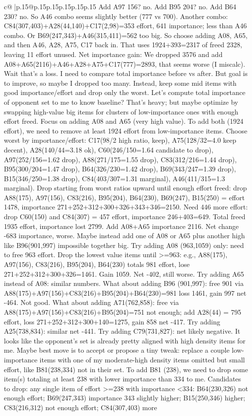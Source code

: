 \documentclass{article}
\begin{document}
{\begin{supertabular}{c@{$\;$}|p{.15\linewidth}@{}p{.15\linewidth}p{.15\linewidth}p{.15\linewidth}p{.15\linewidth}p{.15\linewidth}}
{{{Add A97 156? no. Add B95 204? no. Add B64 230? no. So A46 combo seems slightly better (777 vs 700). Another combo: C84(307,403)+A28(44,140)+C17(2,98)=353 effort, 641 importance; less than A46 combo. Or B69(247,343)+A46(315,411)=562 too big. So choose adding A08, A65, and then A46, A28, A75, C17 back in. That uses 1924+393=2317 of freed 2328, leaving 11 effort unused. Net importance gain: We dropped 3576 and add A08+A65(2116)+A46+A28+A75+C17(777)=2893, that seems worse (I miscalc). Wait that's a loss. I need to compare total importance before vs after. But goal is to improve, so maybe I dropped too many. Instead, keep some mid items with good importance/effort and drop only the worst. Let's compute total importance of opponent set to me to know baseline? That’s heavy; but maybe optimize by swapping high-value big items for clusters of low-importance ones with enough effort freed. Focus on adding A08 and A65 (very high value). To add both (1924 effort), we need to remove at least 1924 effort from low-importance items. Choose worst by importance/effort: C17(98/2 high ratio, keep), A75(128/32=4.0 keep decent), A28(140/44=3.18 ok), C60(246/150=1.64 candidate to drop), A97(252/156=1.62 drop), A88(271/175=1.55 drop), C83(312/216=1.44 drop), B95(300/204=1.47 drop), B64(326/230=1.42 drop), B69(343/247=1.39 drop), B15(346/250=1.38 drop), C84(403/307=1.31 marginal), A46(411/315=1.3 marginal). Drop starting from worst ratios upward until enough effort freed: drop A88(175), A97(156), C83(216), B95(204), B64(230), B69(247), B15(250) = effort 1478, importance 271+252+312+300+326+343+346=2150. Need 446 more effort: drop C60(150) and C84(307) = 457 effort, importance 246+403=649. Total freed 1935 effort, importance lost 2799. Add A08+A65 importance 2116. Net change -683 importance, worse. Maybe instead add one of A08 or A65 plus another high like B96(901,997) impossible together big. Try adding A08 (963,1059) only: need to free 963 effort. Drop the lowest value items until >=963: e.g., A88(175), A97(156), C83(216), B95(204), B64(230) totals 981 effort, lose 271+252+312+300+326=1461. Gain 1059. Net -402, still worse. Try adding A65 instead of A08: similar numbers. What about adding B96 (901,997): free 901 via A88(175)+A97(156)+C83(216)+B95(204)+B64(230)=981 loss 1461, gain 997 net -464. Not good. What about adding A71(762,858): free via A88(175)+A97(156)+C83(216)+B95(204)=751 not enough; add A28(44) = 795 effort, loss 271+252+312+300+140=1275, gain 858 net -417. Try adding A25(738,834): similar net -441. Try adding C79(731,827): net likely negative. It looks like the opponent’s set is already pretty aligned with high density items for me. Maybe best move is to accept or propose a tiny tweak: replace a couple low-importance items with one of my moderate-high density items omitted but small effort, like B81(238,334) not in their set. To add B81 (238), we need to drop some item(s) totaling at least 238 with lower importance than 334 to me. Candidates to drop: any single item of effort >=238 with importance <334: B64(230,326) not enough effort; B69(247,343) importance 343 slightly higher; B15(250,346) higher; C83(216,312) not enough effort; C84(307,403) more }}}
\end{supertabular}}
\end{document}

